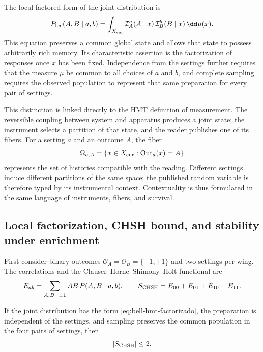 The local factored form of the joint distribution is
\begin{equation}
 P_{\rm loc}(A,B\mid a,b)
 =\int_{X_{\rm enr}}
   \mathcal I_A^a(A\mid x)\,
   \mathcal I_B^b(B\mid x)\,\dd\mu(x).
 \label{eq:bell-hmt-factorizado}
\end{equation}
This equation preserves a common global state and allows that state to possess arbitrarily rich memory. Its characteristic assertion is the factorization of responses once \(x\) has been fixed. Independence from the settings further requires that the measure \(\mu\) be common to all choices of \(a\) and \(b\), and complete sampling requires the observed population to represent that same preparation for every pair of settings.

This distinction is linked directly to the HMT definition of measurement. The
reversible coupling between system and apparatus produces a joint state; the
instrument selects a partition of that state, and the reader publishes one of its
fibers. For a setting \(a\) and an outcome \(A\), the fiber
\[
 \Omega_{a,A}
 =\{x\in X_{\rm enr}:\operatorname{Out}_a(x)=A\}
\]
represents the set of histories compatible with the reading. Different settings
induce different partitions of the same space; the published random variable
is therefore typed by its instrumental context. Contextuality is thus formulated
in the same language of instruments, fibers, and survival.

\subsection{Local factorization, CHSH bound, and stability under enrichment}

First consider binary outcomes
\(\mathcal O_A=\mathcal O_B=\{-1,+1\}\) and two settings per wing. The
correlations and the Clauser--Horne--Shimony--Holt functional \cite{ClauserHorneShimonyHolt1969} are
\begin{equation}
 E_{ab}=\sum_{A,B=\pm1}AB\,P(A,B\mid a,b),
 \qquad
 S_{\rm CHSH}=E_{00}+E_{01}+E_{10}-E_{11}.
 \label{eq:chsh}
\end{equation}

\begin{theorem}
\label{thm:chsh-local}
If the joint distribution has the form
\eqref{eq:bell-hmt-factorizado}, the preparation is independent of the settings, and
sampling preserves the common population in the four pairs of settings, then
\[
 \lvert S_{\rm CHSH}\rvert\leq2.
\]
\end{theorem}

